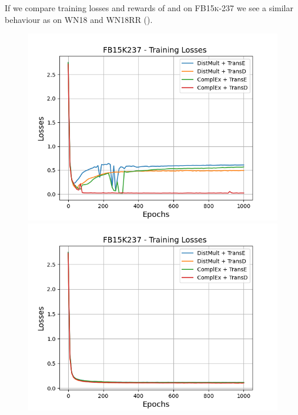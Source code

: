 If we compare training losses and rewards of \usmax and \usmax on \textsc{FB15k-237} we see a similar behaviour as on \textsc{WN18} and \textsc{WN18RR} ().
\begin{figure}
    \centering
    \begin{minipage}{.5\textwidth}
      \centering
      \includegraphics[width=0.9\linewidth]{figures/results/gan_train/not_pretrained/uncertainty/max/entropy/fb15k237/1k_epochs/uncertainty_fb15k237_losses.png}
    \end{minipage}%
    \begin{minipage}{.5\textwidth}
      \centering
      \includegraphics[width=0.9\linewidth]{figures/results/gan_train/not_pretrained/uncertainty/max_distribution/entropy/fb15k237/1k_epochs/uncertainty_fb15k237_losses.png}
    \end{minipage}

\end{figure}

